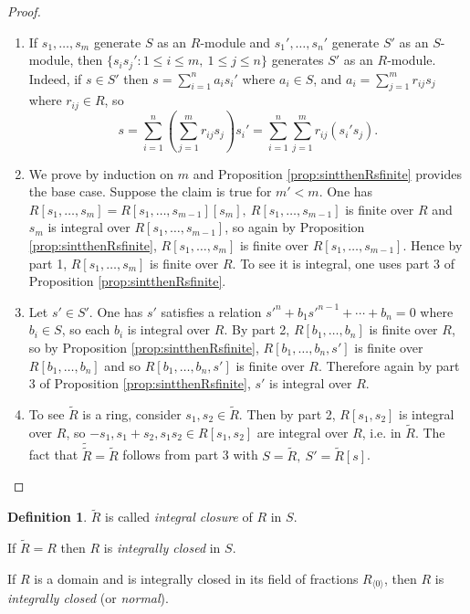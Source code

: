 \documentclass[a4paper]{article}
\theoremstyle{definition}
\newtheorem{defn}{Definition}[subsection]
\begin{document}
\begin{proof}
\begin{enumerate}
\item If $s_1,\ldots,s_m$ generate $S$ as an $R$-module and $s_1',\ldots,s_n'$ generate $S'$ as an $S$-module, then $\{s_is_j':1\leq i\leq m,\ 1\leq j\leq n\}$ generates $S'$ as an $R$-module. Indeed, if $s\in S'$ then $s=\sum_{i=1}^n a_is_i'$ where $a_i\in S$, and $a_i=\sum_{j=1}^m r_{ij}s_j$ where $r_{ij}\in R$, so
\[
s=\sum_{i=1}^n \left(\sum_{j=1}^m r_{ij}s_j\right)s_i'=\sum_{i=1}^n \sum_{j=1}^m r_{ij} (s_i's_j).
\]
\item We prove by induction on $m$ and Proposition \ref{prop:sintthenRsfinite} provides the base case. Suppose the claim is true for $m'<m$. One has $R[s_1,\ldots,s_m]=R[s_1,\ldots,s_{m-1}][s_m],\ R[s_1,\ldots,s_{m-1}]$ is finite over $R$ and $s_m$ is integral over $R[s_1,\ldots,s_{m-1}]$, so again by Proposition \ref{prop:sintthenRsfinite}, $R[s_1,\ldots,s_m]$ is finite over $R[s_1,\ldots,s_{m-1}]$. Hence by part 1, $R[s_1,\ldots,s_{m}]$ is finite over $R$. To see it is integral, one uses part 3 of Proposition \ref{prop:sintthenRsfinite}.
\item Let $s'\in S'$. One has $s'$ satisfies a relation $s'^n+b_1s'^{n-1}+\cdots+b_n=0$ where $b_i\in S$, so each $b_i$ is integral over $R$. By part 2, $R[b_1,\ldots,b_n]$ is finite over $R$, so by Proposition \ref{prop:sintthenRsfinite}, $R[b_1,\ldots,b_n,s']$ is finite over $R[b_1,\ldots,b_n]$ and so $R[b_1,\ldots,b_n,s']$ is finite over $R$. Therefore again by part 3 of Proposition \ref{prop:sintthenRsfinite}, $s'$ is integral over $R$.
\item To see $\widetilde R$ is a ring, consider $s_1,s_2\in\widetilde R$. Then by part 2, $R[s_1,s_2]$ is integral over $R$, so $-s_1,s_1+s_2,s_1s_2\in R[s_1,s_2]$ are integral over $R$, i.e. in $\widetilde R$. The fact that $\widetilde{\widetilde R}=\widetilde R$ follows from part 3 with $S=\widetilde R,\ S'=\widetilde R[s]$.
\end{enumerate}
\end{proof}

\begin{defn}
$\widetilde R$ is called \textit{integral closure} of $R$ in $S$.

If $\widetilde R=R$ then $R$ is \textit{integrally closed} in $S$.

If $R$ is a domain and is integrally closed in its field of fractions $R_{\langle 0\rangle}$, then $R$ is \textit{integrally closed} (or \textit{normal}).
\end{defn}
\end{document}
